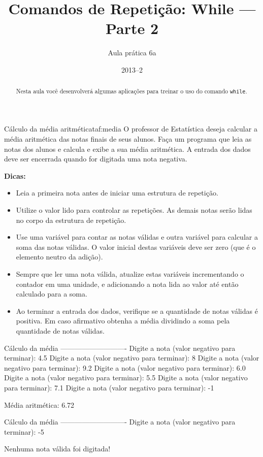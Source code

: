 \documentclass[11pt]{practice}
\begin{document}
\subtitle{Aula prática 6a}
\title{Comandos de Repetição: While --- Parte 2}
\author{}
\date{2013--2}
\maketitle

\begin{abstract}
  Nesta aula você desenvolverá algumas aplicações para treinar o uso do
  comando \texttt{while}.
\end{abstract}

\tableofcontents


\begin{task}[breakable]{Cálculo da média aritmética}{taf:media}
  O professor de Estatística deseja calcular a média aritmética das
  notas finais de seus alunos. Faça um programa que leia as notas dos
  alunos e calcula e exibe a sua média aritmética. A entrada dos dados
  deve ser encerrada quando for digitada uma nota negativa.

  \textbf{Dicas:}
  \begin{itemize}
    \item Leia a primeira nota antes de iniciar uma estrutura de
    repetição.
    \item Utilize o valor lido para controlar as repetições. As demais
    notas serão lidas no corpo da estrutura de repetição.
    \item Use uma variável para contar as notas válidas e outra variável
    para calcular a soma das notas válidas. O valor inicial destas
    variáveis deve ser zero (que é o elemento neutro da adição).
    \item Sempre que ler uma nota válida, atualize estas variáveis
    incrementando o contador em uma unidade, e adicionando a nota lida
    ao valor até então calculado para a soma.
    \item Ao terminar a entrada dos dados, verifique se a quantidade de
    notas válidas é positiva. Em caso afirmativo obtenha a média
    dividindo a soma pela quantidade de notas válidas.
  \end{itemize}

  \begin{runexample}
Cálculo da média
----------------------------
Digite a nota (valor negativo para terminar): 4.5
Digite a nota (valor negativo para terminar): 8
Digite a nota (valor negativo para terminar): 9.2
Digite a nota (valor negativo para terminar): 6.0
Digite a nota (valor negativo para terminar): 5.5
Digite a nota (valor negativo para terminar): 7.1
Digite a nota (valor negativo para terminar): -1

Média aritmética: 6.72
  \end{runexample}

  \begin{runexample}
Cálculo da média
----------------------------
Digite a nota (valor negativo para terminar): -5

Nenhuma nota válida foi digitada!
  \end{runexample}

  \tcblower
  \solution
\end{task}
\end{document}
